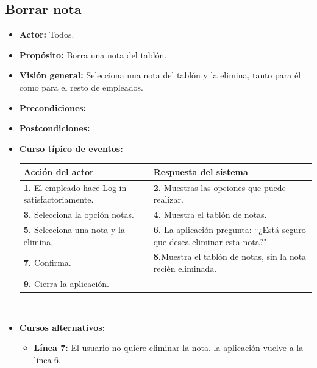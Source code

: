 \documentclass[spanish,a4paper,11pt, twoside]{report}	%
\begin{document}
		\subsection{Borrar nota}
			\begin{itemize}
			\item \textbf{Actor:} Todos.
			\item \textbf{Propósito:} Borra una nota del tablón.
			\item \textbf{Visión general:} Selecciona una nota del tablón y la elimina, tanto para él como para el resto de empleados.
			\item \textbf{Precondiciones:} 
			\item \textbf{Postcondiciones:} 
			\item \textbf{Curso típico de eventos:} 	\\
				\begin{tabular}{|p{6cm}||p{6cm}|}
				\hline
				\textbf{Acción del actor} & \textbf{Respuesta del sistema} \\ \hline \hline
				\textbf{1.}    El empleado hace Log in satisfactoriamente. & \textbf{2.} Muestras las opciones que puede realizar. \\ \hline
				\textbf{3.} Selecciona la opción notas. & \textbf{4.} Muestra el tablón de notas. \\ \hline
				\textbf{5.} Selecciona una nota y la elimina.	& \textbf{6.} La aplicación pregunta: “¿Está seguro que desea eliminar esta nota?". \\ \hline
				\textbf{7.} Confirma.	& \textbf{8.}Muestra el tablón de notas, sin la nota recién eliminada. \\ \hline
				\textbf{9.} Cierra la aplicación. &  \\ \hline
			\end{tabular}
			\\
			\item \textbf{Cursos alternativos:} 
			\begin{itemize}
			\item  \textbf{Línea 7:} El usuario no quiere eliminar la nota. la aplicación vuelve a la línea 6.
			\end {itemize}
		\end {itemize}

	
	\hspace{-2 true cm}
\end{document}
